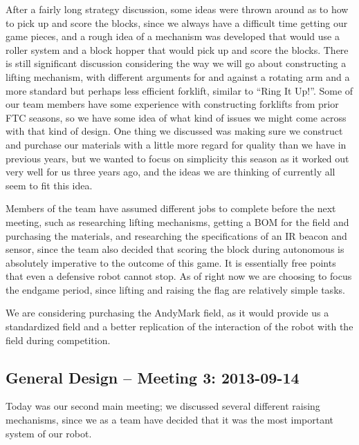 After a fairly long strategy discussion, some ideas were thrown around as to how to pick up and score the blocks, since we always have a difficult time getting our game pieces, and a rough idea of a mechanism was developed that would use a roller system and a block hopper that would pick up and score the blocks. There is still significant discussion considering the way we will go about constructing a lifting mechanism, with different arguments for and against a rotating arm and a more standard but perhaps less efficient forklift, similar to ``Ring It Up!''. Some of our team members have some experience with constructing forklifts from prior FTC seasons, so we have some idea of what kind of issues we might come across with that kind of design. One thing we discussed was making sure we construct and purchase our materials with a little more regard for quality than we have in previous years, but we wanted to focus on simplicity this season as it worked out very well for us three years ago, and the ideas we are thinking of currently all seem to fit this idea.

Members of the team have assumed different jobs to complete before the next meeting, such as researching lifting mechanisms, getting a BOM for the field and purchasing the materials, and researching the specifications of an IR beacon and sensor, since the team also decided that scoring the block during autonomous is absolutely imperative to the outcome of this game. It is essentially free points that even a defensive robot cannot stop. As of right now we are choosing to focus the endgame period, since lifting and raising the flag are relatively simple tasks. 

We are considering purchasing the AndyMark field, as it would provide us a standardized field and a better replication of the interaction of the robot with the field during competition. 

\newpage \subsection{General Design -- Meeting 3: 2013-09-14}
Today was our second main meeting; we discussed several different raising mechanisms, since we as a team have decided that it was the most important system of our robot.

